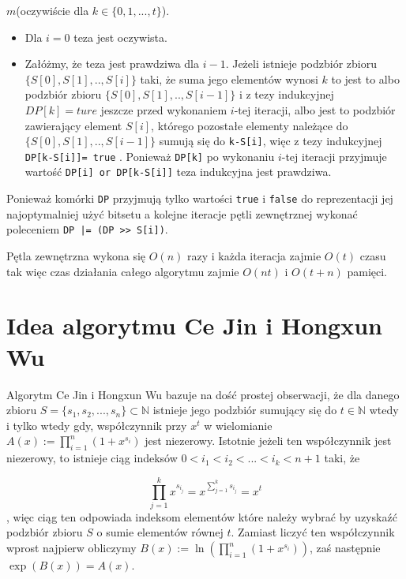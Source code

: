 \documentclass{article}
\begin{document}
 $m$(oczywiście dla $k \in \{0,1,...,t\}$). 
\begin{itemize}
    \item Dla $i = 0$ teza jest oczywista.
    \item Załóżmy, że teza jest prawdziwa dla $i-1$. Jeżeli istnieje podzbiór
    zbioru $\{S \left[ 0 \right],S\left[ 1 \right],..,S\left[ i \right]\}$ taki, że suma jego elementów wynosi $k$ to jest to 
    albo podzbiór zbioru $\{{S\left[0\right],S\left[1\right],..,S\left[i-1\right]\}}$ i z tezy indukcyjnej $DP[k]=ture$
    jeszcze przed wykonaniem $i$-tej iteracji, albo jest to podzbiór zawierający element
    $S\left[i \right]$, którego pozostałe elementy należące do 
    $\{S \left[ 0 \right] ,S \left[ 1 \right],..,S \left[ i-1 \right] \}$
     sumują się 
    do \texttt{k-S[i]}, więc z tezy indukcyjnej \texttt{DP[k-S[i]]= true} . Ponieważ \texttt{DP[k]} po wykonaniu $i$-tej iteracji
    przyjmuje wartość \texttt{DP[i] or DP[k-S[i]]} teza indukcyjna jest prawdziwa.

\end{itemize}
Ponieważ komórki \texttt{DP} przyjmują tylko wartości \texttt{true} i \texttt{false} do reprezentacji jej najoptymalniej
użyć bitsetu a kolejne iteracje pętli zewnętrznej wykonać poleceniem \texttt{DP |= (DP >> S[i])}.

Pętla zewnętrzna wykona się $O(n)$ razy i każda iteracja zajmie $O(t)$ czasu tak więc
czas działania całego algorytmu zajmie $O(nt)$ i $O(t+n)$ pamięci.



\section{Idea algorytmu Ce Jin i Hongxun Wu}


Algorytm Ce Jin i Hongxun Wu bazuje na dość prostej obserwacji, że dla danego zbioru
$S=\{s_1,s_2,...,s_n\} \subset \mathbb{N}$ istnieje jego podzbiór sumujący się do $t \in \mathbb{N}$ wtedy 
i tylko wtedy gdy, współczynnik przy $x^t$ w  wielomianie $A(x) :=\prod_{i = 1}^{n}(1+x^{s_i})$ jest 
niezerowy. Istotnie jeżeli ten współczynnik jest niezerowy, to istnieje ciąg indeksów $0<i_1<i_2<...<i_k<n+1$ taki, że 

$$\prod_{j=1}^{k}x^{s_{i_j}}=x^{\sum_{j=1}^ks_{i_j}}=x^t$$, więc ciąg ten odpowiada indeksom elementów które należy wybrać
by uzyskaźć podzbiór zbioru $S$ o sumie elementów równej $t$.
Zamiast liczyć ten współczynnik wprost najpierw obliczymy $B(x):=\ln(\prod_{i = 1}^{n}(1+x^{s_i}))$, 
zaś następnie $\exp(B(x)) = A(x)$. 
\end{document}
